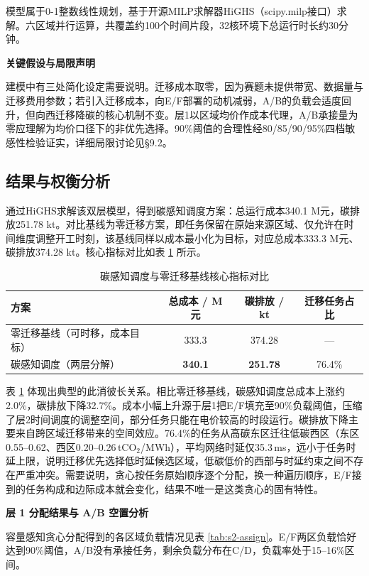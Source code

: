 模型属于0-1整数线性规划，基于开源MILP求解器HiGHS（scipy.milp接口）求解。六区域并行运算，共覆盖约100个时间片段，32核环境下总运行时长约30分钟。

\medskip\noindent\textbf{关键假设与局限声明}\medskip

建模中有三处简化设定需要说明。迁移成本取零，因为赛题未提供带宽、数据量与迁移费用参数；若引入迁移成本，向E/F部署的动机减弱，A/B的负载会适度回升，但向西迁移降碳的核心机制不变。层1以区域均价作成本代理，A/B承接量为零应理解为均价口径下的非优先选择。90\%阈值的合理性经80/85/90/95\%四档敏感性检验证实，详细局限讨论见§9.2。

\subsection{结果与权衡分析}

通过HiGHS求解该双层模型，得到碳感知调度方案：总运行成本340.1 M元，碳排放251.78 kt。对比基线为零迁移方案，即任务保留在原始来源区域、仅允许在时间维度调整开工时刻，该基线同样以成本最小化为目标，对应总成本333.3 M元、碳排放374.28 kt。核心指标对比如表 \ref{tab:s2-core} 所示。

\begin{table}[ht]
\centering
\caption{碳感知调度与零迁移基线核心指标对比}
\label{tab:s2-core}
\begin{tabular}{lccc}
\toprule
方案 & 总成本 / M 元 & 碳排放 / kt & 迁移任务占比 \\
\midrule
零迁移基线（可时移，成本目标） & 333.3 & 374.28 & --- \\
碳感知调度（两层分解）      & \textbf{340.1} & \textbf{251.78} & 76.4\% \\
\bottomrule
\end{tabular}
\end{table}

表 \ref{tab:s2-core} 体现出典型的此消彼长关系。相比零迁移基线，碳感知调度总成本上涨约2.0\%，碳排放下降32.7\%。成本小幅上升源于层1把E/F填充至90\%负载阈值，压缩了层2时间调度的调整空间，部分任务只能在电价较高的时段运行。碳排放下降主要来自跨区域迁移带来的空间效应。76.4\%的任务从高碳东区迁往低碳西区（东区0.55--0.62、西区0.20--0.26\,tCO$_2$/MWh），平均网络时延仅35.3\,ms，远小于任务时延上限，说明迁移优先选择低时延候选区域，低碳低价的西部与时延约束之间不存在严重冲突。需要说明，贪心按任务原始顺序逐个分配，换一种遍历顺序，E/F接到的任务构成和边际成本就会变化，结果不唯一是这类贪心的固有特性。

\medskip\noindent\textbf{层 1 分配结果与 A/B 空置分析}\medskip

容量感知贪心分配得到的各区域负载情况见表 \ref{tab:s2-assign}。E/F两区负载恰好达到90\%阈值，A/B没有承接任务，剩余负载分布在C/D，负载率处于15--16\%区间。

